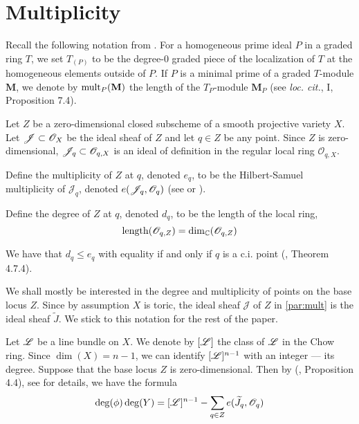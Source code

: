 \documentclass[fleqn,reqno]{amsart}
\begin{document}
\section{Multiplicity}
\label{sec:mult}

\begin{paragraf}
\label{par:mult-ha}
Recall the following notation from \cite{Har77}.
For a homogeneous prime ideal $P$ in a graded ring $T$,
we set $T_{(P)}$ to be the degree-$0$ graded piece of the localization of $T$
at the homogeneous elements outside of $P$.
If $P$ is a minimal prime of a graded $T$-module $\mathbf M$,
we denote by $\operatorname{mult}_P(\mathbf M)$ the length of the $T_P$-module $\mathbf M_P$
(see {\em loc. cit.}, I, Proposition 7.4).
\end{paragraf}

\begin{paragraf}
\label{par:mult}
Let $Z$ be a zero-dimensional closed subscheme of a smooth projective variety $X$.
Let $\mathscr{J}\subset\mathscr{O}_X$ be the ideal sheaf of $Z$
and let $q\in Z$ be any point.
Since $Z$ is zero-dimensional,
$\mathscr{J}_q\subset\mathscr{O}_{q,X}$ is an ideal of definition
in the regular local ring $\mathscr{O}_{q,X}$.

Define the multiplicity of $Z$ at $q$, denoted $e_q$,
to be the Hilbert-Samuel multiplicity of $\mathscr{J}_q$,
denoted $e(\mathscr{J}_q,\mathscr{O}_q)$ (see \citet{Eis95} or \citet{BH98}).

Define the degree of $Z$ at $q$, denoted $d_q$, to be the length of the local ring,
\[	
	\operatorname{length}(\mathscr{O}_{q,Z})=\dim_{\mathbb{C}}(\mathscr{O}_{q,Z})
\]

We have that $d_q\leq e_q$ with equality if and only if $q$ is a c.i. point
(\citet{BH98}, Theorem 4.7.4).
\end{paragraf}

\begin{paragraf}
We shall mostly be interested in the degree and multiplicity of points on the base locus $Z$.
Since by assumption $X$ is toric, the ideal sheaf $\mathscr{J}$ of $Z$ in \eqref{par:mult}
is the ideal sheaf $\widetilde J$.
We stick to this notation for the rest of the paper.
\end{paragraf}

\begin{paragraf}
Let $\mathscr{L}$ be a line bundle on $X$.
We denote by $[\mathscr{L}]$ the class of $\mathscr{L}$ in the Chow ring.
Since $\dim(X)=n-1$, we can identify $[\mathscr{L}]^{n-1}$ with an integer --- its degree.
Suppose that the base locus $Z$ is zero-dimensional.
Then by (\citet{Ful84}, Proposition 4.4), see \citet{Cox-01} for details,
we have the formula
\begin{align}
	\label{eq:degree-formula}
	\deg(\phi)\deg(Y)=[\mathscr L]^{n-1}-\sum_{q\in Z}e(\widetilde{J}_q,\mathscr{O}_q)
\end{align}
\end{paragraf}
\end{document}
